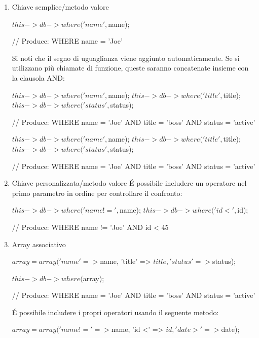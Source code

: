 \begin{itemize}
\begin{enumerate}
\item Chiave semplice/metodo valore

\begin{code}
$this->db->where('name', $name); 

// Produce: WHERE name = 'Joe'
\end{code}

Si noti che il segno di uguaglianza viene aggiunto automaticamente. Se si utilizzano più chiamate di funzione, queste saranno concatenate insieme con la clausola AND:

\begin{code}
$this->db->where('name', $name);
$this->db->where('title', $title);
$this->db->where('status', $status); 

// Produce: WHERE name = 'Joe' AND title = 'boss' AND status = 'active'
\end{code}

\begin{code}
$this->db->where('name', $name);
$this->db->where('title', $title);
$this->db->where('status', $status); 

// Produce: WHERE name = 'Joe' AND title = 'boss' AND status = 'active'
\end{code}

\item Chiave personalizzata/metodo valore
\'E possibile includere un operatore nel primo parametro in ordine per controllare il confronto:

\begin{code}
$this->db->where('name !=', $name);
$this->db->where('id <', $id); 

// Produce: WHERE name != 'Joe' AND id < 45
\end{code}

\item Array associativo

\begin{code}
$array = array('name' => $name, 'title' => $title, 'status' => $status);

$this->db->where($array); 

// Produce: WHERE name = 'Joe' AND title = 'boss' AND status = 'active'
\end{code}

\'E possibile includere i propri operatori usando il seguente metodo:

\begin{code}
$array = array('name !=' => $name, 'id <' => $id, 'date >' => $date);


\end{code}
\end{enumerate}
\end{itemize}
